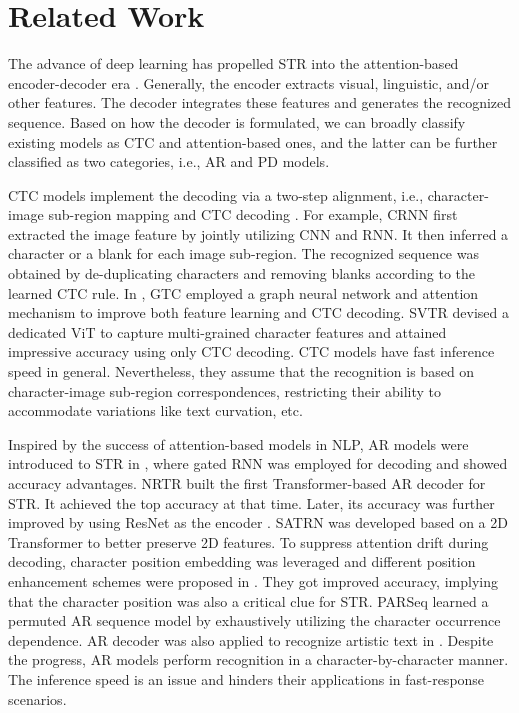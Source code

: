 \documentclass[10pt,journal,compsoc]{IEEEtran}
\begin{document}
\section{Related Work}
The advance of deep learning has propelled STR into the attention-based encoder-decoder era \cite{chen2021text, YANG20221458}. Generally, the encoder extracts visual, linguistic, and/or other features. The decoder integrates these features and generates the recognized sequence. Based on how the decoder is formulated, we can broadly classify existing models as CTC and attention-based ones, and the latter can be further classified as two categories, i.e., AR and PD models.

CTC models implement the decoding via a two-step alignment, i.e., character-image sub-region mapping and CTC decoding \cite{CTC}. For example, CRNN \cite{shi2017crnn} first extracted the image feature by jointly utilizing CNN and RNN. It then inferred a character or a blank for each image sub-region. The recognized sequence was obtained by de-duplicating characters and removing blanks according to the learned CTC rule. In \cite{hu2020gtc}, GTC employed a graph neural network and attention mechanism to improve both feature learning and CTC decoding. SVTR \cite{duijcai2022svtr} devised a dedicated ViT to capture multi-grained character features and attained impressive accuracy using only CTC decoding. CTC models have fast inference speed in general. Nevertheless, they assume that the recognition is based on character-image sub-region correspondences, restricting their ability to accommodate variations like text curvation, etc.

Inspired by the success of attention-based models in NLP, AR models were introduced to STR in \cite{shi2019aster,li2019sar,wang2020decoupled}, where gated RNN \cite{lstm, gru} was employed for decoding and showed accuracy advantages. NRTR \cite{Sheng2019nrtr} built the first Transformer-based AR decoder \cite{NIPS2017_attn} for STR. It achieved the top accuracy at that time. Later, its accuracy was further improved by using ResNet as the encoder \cite{mmocr2021}. SATRN \cite{lee2020recognizing} was developed based on a 2D Transformer to better preserve 2D features. To suppress attention drift during decoding, character position embedding was leveraged and different position enhancement schemes were proposed in \cite{wan2020textscanner,yue2020robustscanner,zheng2023cdistnet}. They got improved accuracy, implying that the character position was also a critical clue for STR. PARSeq \cite{BautistaA22PARSeq} learned a permuted AR sequence model by exhaustively utilizing the character occurrence dependence. AR decoder was also applied to recognize artistic text in \cite{xie2022toward}. Despite the progress, AR models perform recognition in a character-by-character manner. The inference speed is an issue and hinders their applications in fast-response scenarios. 
\end{document}
